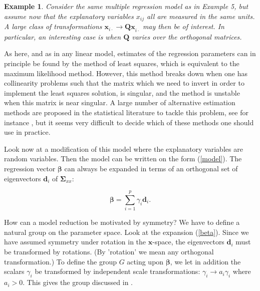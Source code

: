 \documentclass[a4paper, 11pt]{article}
\newtheorem{example}{Example}
\begin{document}
\smallskip

\begin{example}
  Consider the same multiple regression model as in Example 5, but assume now that the explanatory variables $x_{ij}$ all are measured in the same units. A large class of transformations $\bm{x}_{i\cdot}\rightarrow \bm{Qx}_{i\cdot}$ may then be of interest. In particular, an interesting case is when $\bm{Q}$ varies over the orthogonal matrices.
\end{example}

\smallskip

As here, and as in any linear model, estimates of the regression parameters can in principle be found by the method of least squares, which is equivalent to
the maximum likelihood method. However, this method breaks down when one has collinearity problems such that the matrix which we need to invert in order to implement the least squares solution, is singular, and the method is unstable when this matrix is near singular. A large number of alternative estimation methods are proposed in the statistical literature to tackle this problem, see for instance \citet{hastie2009elements}, but it seems very difficult to decide which of these methods one should use in practice.

Look now at a modification of this model where the explanatory variables are random variables. Then the model can be written on the form (\ref{model}).  The regression vector $\bm{\beta}$ can always be expanded in terms of an orthogonal set of eigenvectors $\bm{d}_i$ of $\bm{\Sigma}_{xx}$:

\begin{equation}
  \bm{\beta}=\sum_{i=1}^p \gamma_i \bm{d}_i .
  \label{beta}
\end{equation}

How can a model reduction be motivated by symmetry? We have to define a natural group on the parameter space. Look at the expansion (\ref{beta}). Since we have assumed symmetry under rotation in the $\bm{x}$-space, the eigenvectors $\bm{d}_i$ must be transformed by rotations. (By 'rotation' we mean any orthogonal transformation.) To define the group $G$ acting upon $\bm{\beta}$, we let in addition the scalars $\gamma_i$ be transformed by independent scale transformations: $\gamma_i \rightarrow a_i \gamma_i$ where $a_i >0$. This gives the group discussed in \citet{helland2012near}.
\end{document}
